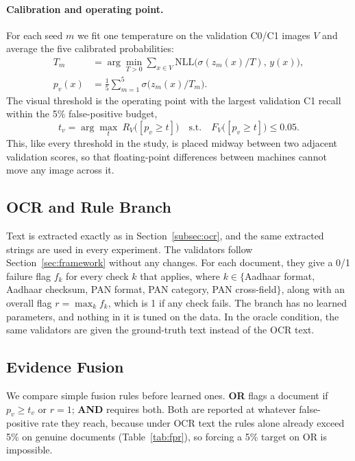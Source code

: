 \documentclass[VANCOUVER,Times1COL]{WileyNJDv5}
\begin{document}
\paragraph*{Calibration and operating point.} For each seed $m$ we fit
one temperature\cite{guo} on the validation C0/C1 images $V$ and
average the five calibrated probabilities:
\begin{equation}
\label{eq:calib}
\begin{aligned}
T_m&=\arg\min_{T>0}\sum_{x\in V}\mathrm{NLL}\big(\sigma(z_m(x)/T),\,y(x)\big),\\
p_v(x)&=\frac{1}{5}\sum_{m=1}^{5}\sigma\big(z_m(x)/T_m\big).
\end{aligned}
\end{equation}
The visual threshold is the operating point with the largest validation
C1 recall within the 5\% false-positive budget,
\begin{equation}
\label{eq:threshold}
t_v=\arg\max_{t}\ R_{V}\big([p_v\ge t]\big)
\quad\text{s.t.}\quad F_{V}\big([p_v\ge t]\big)\le 0.05 .
\end{equation}
This, like every threshold in the study, is placed midway between two
adjacent validation scores, so that floating-point differences between
machines cannot move any image across it.

\subsection{OCR and Rule Branch}

Text is extracted exactly as in Section~\ref{subsec:ocr}, and the same extracted strings are used in every experiment. The validators follow Section~\ref{sec:framework} without any changes. For each document, they give a 0/1 failure flag $f_k$ for every check $k$ that applies, where $k \in \{$Aadhaar format, Aadhaar checksum, PAN format, PAN category, PAN cross-field$\}$, along with an overall flag $r = \max_k f_k$, which is 1 if any check fails. The branch has no learned parameters, and nothing in it is tuned on the data. In the oracle condition, the same validators are given the ground-truth text instead of the OCR text.

\subsection{Evidence Fusion}
\label{sec:fusion}

We compare simple fusion rules before learned ones. \textbf{OR} flags a
document if $p_v \ge t_v$ or $r=1$; \textbf{AND} requires both. Both are
reported at whatever false-positive rate they reach, because under OCR
text the rules alone already exceed 5\% on genuine documents
(Table~\ref{tab:fpr}), so forcing a 5\% target on OR is impossible.
\end{document}
